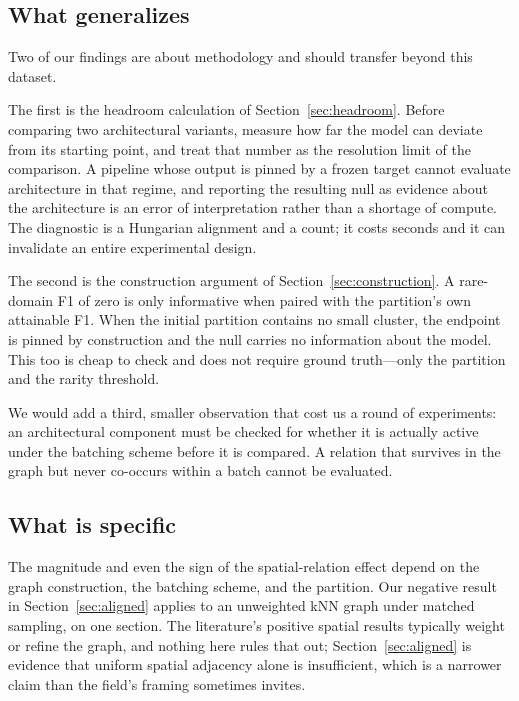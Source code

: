 \documentclass[twocolumn,10pt]{article}
\begin{document}
\subsection{What generalizes}

Two of our findings are about methodology and should transfer beyond this dataset.

The first is the headroom calculation of Section~\ref{sec:headroom}. Before comparing two architectural variants, measure how far the model can deviate from its starting point, and treat that number as the resolution limit of the comparison. A pipeline whose output is pinned by a frozen target cannot evaluate architecture in that regime, and reporting the resulting null as evidence about the architecture is an error of interpretation rather than a shortage of compute. The diagnostic is a Hungarian alignment and a count; it costs seconds and it can invalidate an entire experimental design.

The second is the construction argument of Section~\ref{sec:construction}. A rare-domain F1 of zero is only informative when paired with the partition's own attainable F1. When the initial partition contains no small cluster, the endpoint is pinned by construction and the null carries no information about the model. This too is cheap to check and does not require ground truth---only the partition and the rarity threshold.

We would add a third, smaller observation that cost us a round of experiments: an architectural component must be checked for whether it is actually active under the batching scheme before it is compared. A relation that survives in the graph but never co-occurs within a batch cannot be evaluated.

\subsection{What is specific}

The magnitude and even the sign of the spatial-relation effect depend on the graph construction, the batching scheme, and the partition. Our negative result in Section~\ref{sec:aligned} applies to an unweighted kNN graph under matched sampling, on one section. The literature's positive spatial results typically weight or refine the graph, and nothing here rules that out; Section~\ref{sec:aligned} is evidence that uniform spatial adjacency alone is insufficient, which is a narrower claim than the field's framing sometimes invites.
\end{document}
